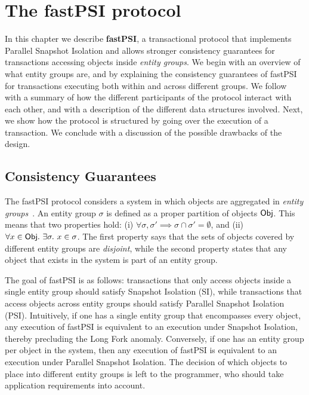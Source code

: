 \cleardoublepage
\chapter{The fastPSI protocol}
\label{chapter:protocol}

In this chapter we describe \textbf{fastPSI}, a transactional protocol that implements Parallel Snapshot Isolation and allows stronger consistency guarantees for transactions accessing objects inside \emph{entity groups}. We begin with an overview of what entity groups are, and by explaining the consistency guarantees of fastPSI for transactions executing both within and across different groups. We follow with a summary of how the different participants of the protocol interact with each other, and with a description of the different data structures involved. Next, we show how the protocol is structured by going over the execution of a transaction. We conclude with a discussion of the possible drawbacks of the design.

\section{Consistency Guarantees}

The fastPSI protocol considers a system in which objects are aggregated in \emph{entity groups}~\citep{baker_megastore}. An entity group $\sigma$ is defined as a proper partition of objects ${\sf Obj}$. This means that two properties hold: (i) $\forall \sigma, \sigma' \implies \sigma \cap \sigma' = \emptyset$, and (ii) $\forall x \in {\sf Obj} .\ \exists \sigma .\ x \in \sigma$. The first property says that the sets of objects covered by different entity groups are \emph{disjoint}, while the second property states that any object that exists in the system is part of an entity group.

The goal of fastPSI is as follows: transactions that only access objects inside a single entity group should satisfy Snapshot Isolation (SI), while transactions that access objects across entity groups should satisfy Parallel Snapshot Isolation (PSI). Intuitively, if one has a single entity group that encompasses every object, any execution of fastPSI is equivalent to an execution under Snapshot Isolation, thereby precluding the Long Fork anomaly. Conversely, if one has an entity group per object in the system, then any execution of fastPSI is equivalent to an execution under Parallel Snapshot Isolation. The decision of which objects to place into different entity groups is left to the programmer, who should take application requirements into account.


